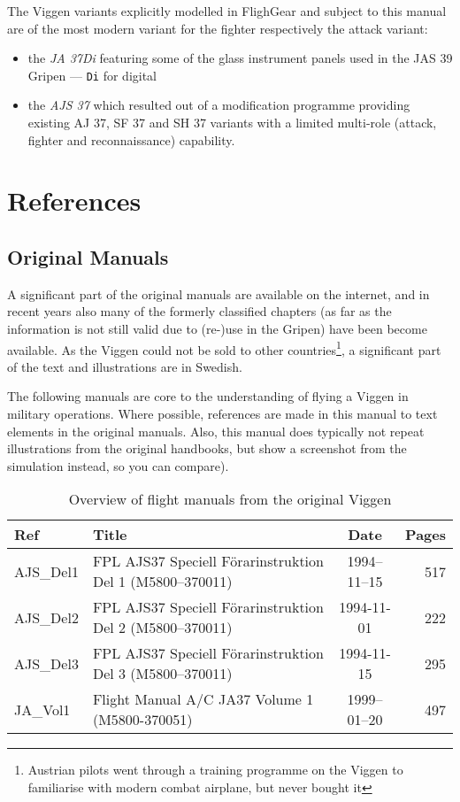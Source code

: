 The Viggen variants explicitly modelled in FlighGear and subject to this manual are of the most modern variant for the fighter respectively the attack variant:
\begin{itemize}
 \item the \emph{JA 37Di} featuring some of the glass instrument panels used in the JAS 39 Gripen --- \texttt{Di} for digital
 \item the \emph{AJS 37} which resulted out of a modification programme providing existing AJ 37, SF 37 and SH 37 variants with a limited multi-role (attack, fighter and reconnaissance) capability.
 \end{itemize} 

\section{References}

\subsection{Original Manuals}
A significant part of the original manuals are available on the internet, and in recent years also many of the formerly classified chapters (as far as the information is not still valid due to (re-)use in the Gripen) have been become available. As the Viggen could not be sold to other countries\footnote{Austrian pilots went through a training programme on the Viggen to familiarise with modern combat airplane, but never bought it}, a significant part of the text and illustrations are in Swedish.

The following manuals are core to the understanding of flying a Viggen in military operations. Where possible, references are made in this manual to text elements in the original manuals. Also, this manual does typically not repeat illustrations from the original handbooks, but show a screenshot from the simulation instead, so you can compare).

\begin{table}[!th]
\begin{tabular}{|l|l|c|r|}
\hline
Ref & Title & Date & Pages \\
\hline
AJS\_Del1 & FPL AJS37 Speciell Förarinstruktion Del 1 (M5800--370011) & 1994--11--15 & 517 \\
AJS\_Del2 & FPL AJS37 Speciell Förarinstruktion Del 2 (M5800--370011) & 1994-11-01 & 222 \\
AJS\_Del3 & FPL AJS37 Speciell Förarinstruktion Del 3 (M5800--370011) & 1994-11-15 & 295 \\
JA\_Vol1 & Flight Manual A/C JA37 Volume 1 (M5800-370051) & 1999--01--20 & 497 \\
\hline
\end{tabular}
\caption{Overview of flight manuals from the original Viggen}
\end{table}

